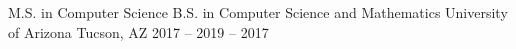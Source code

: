 

\begin{cventries}

  \cventry
    {M.S. in Computer Science \newline B.S. in Computer Science and Mathematics} %
    {University of Arizona} %
    {Tucson, AZ} %
    {2017 -- 2019  -- 2017} %
    {}

    \vspace{-0.7cm}
\end{cventries}
